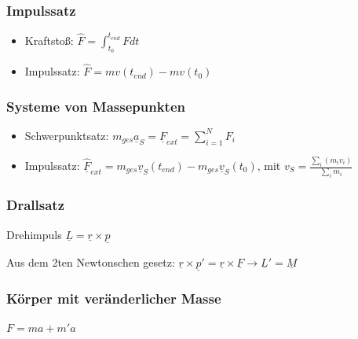 \documentclass[11pt]{article}
\begin{document}
\subsubsection{Impulssatz}
\label{sec:org2a32d87}
\begin{itemize}
\item Kraftstoß: \(\hat{F} = \int_{t_0}^{t_{end}} Fdt\)
\item Impulssatz: \(\hat{F} = mv(t_{end}) - mv(t_0)\)
\end{itemize}

\subsubsection{Systeme von Massepunkten}
\label{sec:org3e3cb84}
\begin{itemize}
\item Schwerpunktsatz: \(m_{ges}\underline{a}_S = \underline{F}_{ext} = \sum_{i=1}^N F_i\)
\item Impulssatz: \(\hat{\underline{F}}_{ext} = m_{ges} \underline{v}_S(t_{end}) - m_{ges} \underline{v}_S(t_0)\), mit \(v_S = \frac{\sum_i(m_i v_i)}{\sum_i m_i}\)
\end{itemize}

\subsubsection{Drallsatz}
\label{sec:org4a3e141}
Drehimpuls \(\underline{L} = \underline{r} \times \underline{p}\)

Aus dem 2ten Newtonschen gesetz:
\(\underline{r} \times \underline{p}' = \underline{r} \times \underline{F} \rightarrow \underline{L}' = \underline{M}\)

\subsubsection{Körper mit veränderlicher Masse}
\label{sec:orgfa931ff}
\(F = ma + m'a\)
\end{document}
